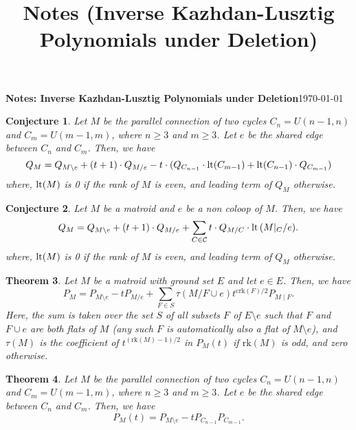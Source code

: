 \documentclass[10pt]{article}
\title{Notes (Inverse Kazhdan-Lusztig Polynomials under Deletion)}
\newcommand{\lt}{\normalfont\text{lt}}
\newtheorem{theorem}{Theorem}
\newtheorem{conjecture}[theorem]{Conjecture}
\theoremstyle{remark}
\begin{document}
{\textbf{Notes: Inverse Kazhdan-Lusztig Polynomials under Deletion}}\hfill {\small{\today}}

\hrulefill
\begin{conjecture}
    Let $M$ be the parallel connection of two cycles $C_n = U(n-1, n)$ and $C_m = U(m-1, m)$, where $n \geq 3$ and $m \geq 3$.
    Let $e$ be the shared edge between $C_n$ and $C_m$. Then, we have
    \begin{equation}
        Q_{M} = Q_{M\setminus e} + (t + 1)\cdot Q_{M/e} - t\cdot(Q_{C_{n-1}}\cdot \lt(C_{m-1}) + \lt(C_{n-1})\cdot Q_{C_{m-1}})
        \end{equation}
    where, $\lt(M)$ is 0 if the rank of $M$ is even, and leading term of $Q_M$ otherwise.
    \end{conjecture}

\begin{conjecture}
    Let $M$ be a matroid and $e$ be a non coloop of $M$. Then, we have
    \begin{equation}
        Q_{M} = Q_{M\setminus e} + (t + 1)\cdot Q_{M/e} + \sum_{C\in \mathcal{C}}{t\cdot Q_{M/C}\cdot \lt\left({M|_C /e}
        \right)}.
    \end{equation}
    where, $\lt(M)$ is 0 if the rank of $M$ is even, and leading term of $Q_M$ otherwise.
    \end{conjecture}

\begin{theorem}
    Let $M$ be a matroid with ground set $E$ and let $e \in E$. Then, we have
    \begin{equation}
        P_M = P_{M \setminus e} - t P_{M / e} + \sum_{F \in S} \tau(M/{F \cup e}) t^{\text{crk} (F)/2} P_{M\mid F}.
    \end{equation}
    Here, the sum is taken over the set $S$ of all subsets $F$ of $E \setminus e$ such that $F$ and $F \cup e$ are both flats of $M$
    (any such $F$ is automatically also a flat of $M \setminus e$), and $\tau(M)$ is the coefficient of
    $t^{(\text{rk} (M) - 1)/2}$ in $P_M(t)$ if $\text{rk} (M)$ is odd, and zero otherwise.
\end{theorem}

\begin{theorem}
    Let $M$ be the parallel connection of two cycles $C_n = U(n-1, n)$ and $C_m = U(m-1, m)$, where $n \geq 3$ and $m \geq 3$. Let $e$ be the shared edge between $C_n$ and $C_m$. Then, we have
    \begin{equation}
        P_M(t) = P_{M \setminus e} - t P_{C_{n-1}}P_{C_{m-1}}.
    \end{equation}
\end{theorem}
\end{document}

